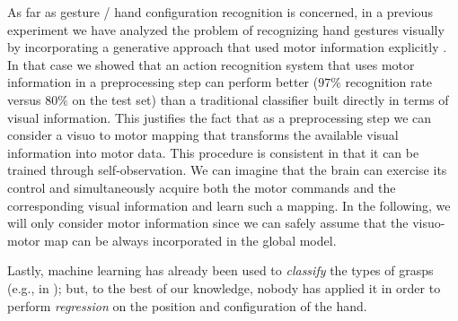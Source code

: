 As far as gesture / hand configuration recognition is concerned, in a
previous experiment we have analyzed the problem of recognizing hand
gestures visually by incorporating a generative approach that used
motor information explicitly \cite{lopes-05,metta-06}. In that case we
showed that an action recognition system that uses motor information
in a preprocessing step can perform better ($97\%$ recognition rate
versus $80\%$ on the test set) than a traditional classifier built
directly in terms of visual information. This justifies the fact that
as a preprocessing step we can consider a visuo to motor mapping that
transforms the available visual information into motor data. This
procedure is consistent in that it can be trained through
self-observation. We can imagine that the brain can exercise its
control and simultaneously acquire both the motor commands and the
corresponding visual information and learn such a mapping. In the
following, we will only consider motor information since we can safely
assume that the visuo-motor map can be always incorporated in the global
model.

Lastly, machine learning has already been used to \emph{classify} the
types of grasps (e.g., in \cite{degranville,heumer}); but, to the best
of our knowledge, nobody has applied it in order to perform
\emph{regression} on the position and configuration of the hand.
